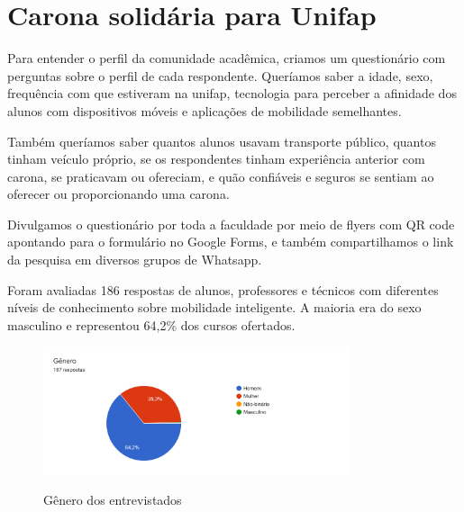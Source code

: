 %
%


\chapter{Carona solidária para Unifap}\label{chap:Carona solidária para Unifap}  

Para entender o perfil da comunidade acadêmica, criamos um questionário com perguntas sobre o perfil de cada respondente. Queríamos saber a idade, sexo, frequência com que estiveram na unifap, tecnologia para perceber a afinidade dos alunos com dispositivos móveis e aplicações de mobilidade semelhantes.

Também queríamos saber quantos alunos usavam transporte público, quantos tinham veículo próprio, se os respondentes tinham experiência anterior com carona, se praticavam ou ofereciam, e quão confiáveis e seguros se sentiam ao oferecer ou proporcionando uma carona.

Divulgamos o questionário por toda a faculdade por meio de flyers com QR code apontando para o formulário no Google Forms, e também compartilhamos o link da pesquisa em diversos grupos de Whatsapp.

Foram avaliadas 186 respostas de alunos, professores e técnicos com diferentes níveis de conhecimento sobre mobilidade inteligente. A maioria era do sexo masculino e representou 64,2\% dos cursos ofertados.

\begin{figure}[!hbtp]
	\centering
	\caption{Gênero dos entrevistados}
	\includegraphics[width=0.8\textwidth]{./04-figuras/questionario/2.png}
	\label{fig:genero}
\end{figure}

